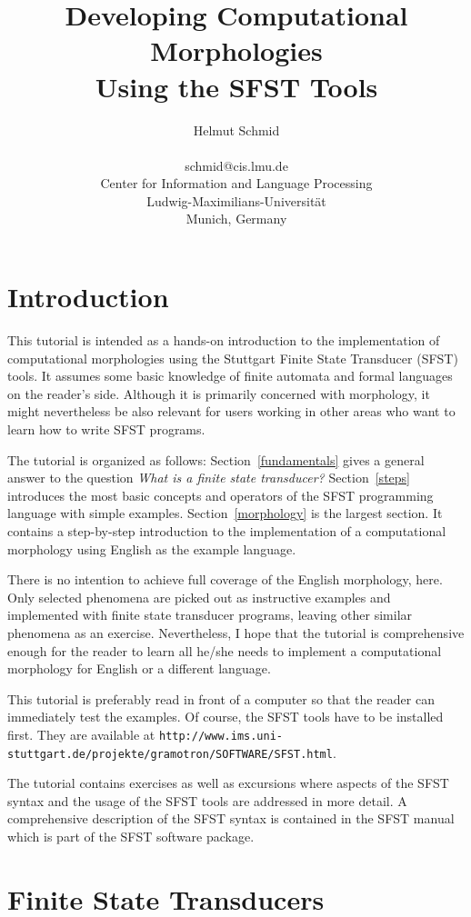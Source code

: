 \documentclass[11pt]{article}
\title{Developing Computational Morphologies\\Using the SFST Tools}
\author{Helmut Schmid\\\\schmid@cis.lmu.de\\
  Center for Information and Language Processing\\
  Ludwig-Maximilians-Universit{\"a}t\\Munich, Germany}
\date{}
\begin{document}
\maketitle

\section{Introduction}

This tutorial is intended as a hands-on introduction to the
implementation of computational morphologies using the Stuttgart
Finite State Transducer (SFST) tools. It assumes some basic knowledge
of finite automata and formal languages on the reader's side. Although
it is primarily concerned with morphology, it might nevertheless be
also relevant for users working in other areas who want to learn how
to write SFST programs.

The tutorial is organized as follows: Section~\ref{fundamentals} gives
a general answer to the question \emph{What is a finite state
  transducer?} Section~\ref{steps} introduces the most basic concepts
and operators of the SFST programming language with simple examples.
Section~\ref{morphology} is the largest section. It contains a
step-by-step introduction to the implementation of a computational
morphology using English as the example language.

There is no intention to achieve full coverage of the English
morphology, here. Only selected phenomena are picked out as instructive
examples and implemented with finite state transducer programs,
leaving other similar phenomena as an exercise. Nevertheless, I hope
that the tutorial is comprehensive enough for the reader to learn all
he/she needs to implement a computational morphology for English or
a different language.

This tutorial is preferably read in front of a computer so that the
reader can immediately test the examples. Of course, the SFST tools
have to be installed first. They are available at
\texttt{http://www.ims.uni-stuttgart.de/projekte/gramotron/SOFTWARE/SFST.html}.

The tutorial contains exercises as well as excursions where aspects of
the SFST syntax and the usage of the SFST tools are addressed in more
detail. A comprehensive description of the SFST syntax is contained in
the SFST manual which is part of the SFST software package.


\section{Finite State Transducers\label{fundamentals}}
\end{document}
